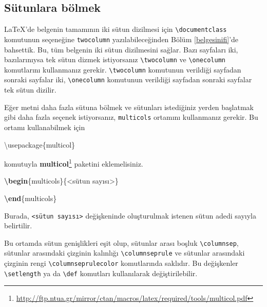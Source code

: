 \documentclass[
  10pt,
]{scrbook}
\newenvironment{Shaded}{}{}
\newcommand{\BuiltInTok}[1]{#1}
\newcommand{\ExtensionTok}[1]{#1}
\newcommand{\KeywordTok}[1]{\textcolor[rgb]{0.00,0.44,0.13}{\textbf{#1}}}
\newcommand{\NormalTok}[1]{#1}
\renewcommand{\href}[2]{#2\footnote{\url{#1}}}
\theoremstyle{definition}
\theoremstyle{definition}
\theoremstyle{definition}
\theoremstyle{definition}
\theoremstyle{remark}
\begin{document}
\hypertarget{suxfctunlara-buxf6lmek}{%
\subsection{Sütunlara bölmek}\label{suxfctunlara-buxf6lmek}}

LaTeX'de belgenin tamamının iki sütun dizilmesi için \texttt{\textbackslash{}documentclass} komutunun seçeneğine \texttt{twocolumn} yazılabileceğinden Bölüm \ref{belgesinifi}'de bahsettik. Bu, tüm belgenin iki sütun dizilmesini sağlar. Bazı sayfaları iki, bazılarınıysa tek sütun dizmek istiyorsanız \texttt{\textbackslash{}twocolumn} ve \texttt{\textbackslash{}onecolumn} komutlarını kullanmanız gerekir. \texttt{\textbackslash{}twocolumn} komutunun verildiği sayfadan sonraki sayfalar iki, \texttt{\textbackslash{}onecolumn} komutunun verildiği sayfadan sonraki sayfalar tek sütun dizilir.

Eğer metni daha fazla sütuna bölmek ve sütunları istediğiniz yerden başlatmak gibi daha fazla seçenek istiyorsanız, \texttt{multicols} ortamını kullanmanız gerekir. Bu ortamı kullanabilmek için

\begin{Shaded}
\begin{Highlighting}[]
\BuiltInTok{\textbackslash{}usepackage}\NormalTok{\{}\ExtensionTok{multicol}\NormalTok{\}}
\end{Highlighting}
\end{Shaded}

komutuyla \href{http://ftp.ntua.gr/mirror/ctan/macros/latex/required/tools/multicol.pdf}{\textbf{multicol}} paketini eklemelisiniz.

\begin{Shaded}
\begin{Highlighting}[]
\KeywordTok{\textbackslash{}begin}\NormalTok{\{}\ExtensionTok{multicols}\NormalTok{\}\{\textless{}sütun sayısı\textgreater{}\}}

\KeywordTok{\textbackslash{}end}\NormalTok{\{}\ExtensionTok{multicols}\NormalTok{\}}
\end{Highlighting}
\end{Shaded}

Burada, \texttt{\textless{}sütun\ sayısı\textgreater{}} değişkeninde oluşturulmak istenen sütun adedi sayıyla belirtilir.

Bu ortamda sütun genişlikleri eşit olup, sütunlar arası boşluk \texttt{\textbackslash{}columnsep}, sütunlar arasındaki çizginin kalınlığı \texttt{\textbackslash{}columnseprule} ve sütunlar arasındaki çizginin rengi \texttt{\textbackslash{}columnseprulecolor} komutlarında saklıdır. Bu değişkenler \texttt{\textbackslash{}setlength} ya da \texttt{\textbackslash{}def} komutları kullanılarak değiştirilebilir.
\end{document}
